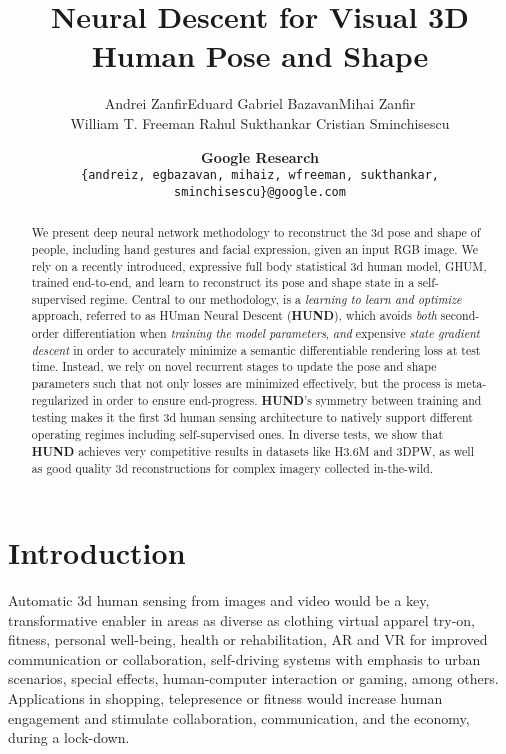 \documentclass[final]{cvpr}
\title{Neural Descent for Visual 3D Human Pose and Shape}
\author{
Andrei Zanfir\quad Eduard Gabriel Bazavan\quad Mihai Zanfir \\ William T. Freeman \quad Rahul Sukthankar \quad Cristian Sminchisescu\\
\and
{\bf Google Research}\\
{\tt\small \{andreiz, egbazavan, mihaiz, wfreeman, sukthankar, sminchisescu\}@google.com}\\
}
\begin{document}
\maketitle

\begin{abstract}
We present deep neural network methodology to reconstruct the 3d pose and shape of people, including hand gestures and facial expression, given an input RGB image. We rely on a recently introduced, expressive full body statistical 3d human model, GHUM, trained end-to-end,
and learn to reconstruct its pose and shape state in a self-supervised regime. Central to our methodology, is a \emph{learning to learn and optimize} approach, referred to as HUman Neural Descent ({\bf HUND}), which avoids \emph{both} second-order differentiation when \emph{training the model parameters}, \emph{and} expensive \emph{state gradient descent} in order to accurately minimize a semantic differentiable rendering loss at test time. Instead, we rely on novel recurrent stages to update the pose and shape parameters such that not only losses are minimized effectively, but the process is meta-regularized in order to ensure end-progress.
{\bf HUND}'s symmetry between training and testing makes it the first 3d human sensing architecture to natively support different operating regimes including self-supervised ones. In diverse tests, we show that {\bf HUND} achieves very competitive results in datasets like H3.6M and 3DPW, as well as good quality 3d reconstructions for complex imagery collected in-the-wild.
\end{abstract}

\section{Introduction}

Automatic 3d human sensing from images and video would be a key, transformative enabler in areas as diverse as clothing virtual apparel try-on, fitness, personal well-being, health or rehabilitation, AR and VR for improved communication or collaboration, self-driving systems with emphasis to urban scenarios, special effects, human-computer interaction or gaming, among others. Applications in shopping, telepresence or fitness would increase human engagement and stimulate collaboration, communication, and the economy, during a lock-down.
\end{document}
